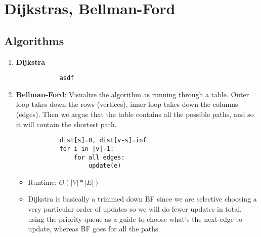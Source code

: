 
\section[Dijkstras, Bellman-Ford -- {\it Lecture 7}]{Dijkstras, Bellman-Ford}



\subsection{Algorithms}

    \begin{enumerate}
        \item \textbf{Dijkstra}
        \begin{verbatim}
            asdf
        \end{verbatim}
        \item \textbf{Bellman-Ford}: Visualize the algorithm as running through a table. Outer loop takes down the rows (vertices), inner loop takes down the columns (edges). Then we argue that the table contains all the possible paths, and so it will contain the shortest path.
            \begin{verbatim}
            dist[s]=0, dist[v-s]=inf
            for i in |v|-1:
                for all edges:
                    update(e)
            \end{verbatim}

            \begin{itemize}
                \item Runtime: $O(|V|*|E|)$
                \item Dijkstra is basically a trimmed down BF since we are selective choosing a very particular order of updates so we will do fewer updates in total, using the priority queue as a guide to choose what's the next edge to update, whereas BF goes for all the paths.
            \end{itemize}
        
    \end{enumerate}



